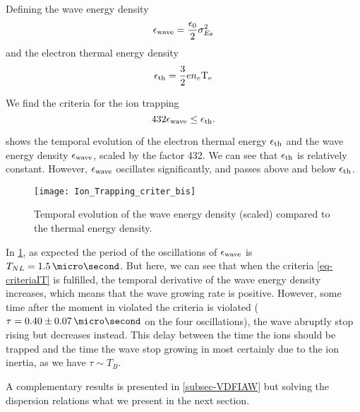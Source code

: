     Defining the wave energy  density
    \begin{equation} \label{eq-waveE}
      \epsilon_{\rm wave} = \frac{\epsilon_0}{2} \sigma_{E_{\theta}}^2
    \end{equation}
    and the electron thermal energy density
    \begin{equation} \label{eq-thE}
      \epsilon_{\rm th} = \frac{3}{2} e n_e \mathrm{T_e}
    \end{equation}
    
    We find the criteria for the ion trapping
    \begin{equation} \label{eq-criteriaIT}
      432 \epsilon_{\rm wave} \leq \epsilon_{\rm th}.
    \end{equation}
    
     shows the temporal evolution of the electron thermal energy $\epsilon_{\rm th}$ and the wave energy density $\epsilon_{\rm wave}$, scaled by the factor 432.
    We can see that $\epsilon_{\rm th}$ is relatively constant.
    However, $\epsilon_{\rm wave}$  oscillates significantly, and passes above and below $\epsilon_{\rm th}$.
    
    \begin{figure}[hbtp]
      \centering
      \texttt{[image: Ion\_Trapping\_criter\_bis]}
      \caption{Temporal evolution of the wave energy density (scaled) compared to the thermal energy density.}
      \label{fig-tempITcrit}
    \end{figure}
    
    In \cref{fig-tempITcrit}, as expected the period of the oscillations of $\epsilon_{\rm wave}$ is $T_{NL} = 1.5\,\micro\second$.
    But here, we can see that when the criteria \cref{eq-criteriaIT} is fulfilled, the temporal derivative of the wave energy density increases, which means that the wave growing rate is positive.
    However, some time after the moment in violated the criteria is violated ($\tau = 0.40 \pm 0.07 \,\micro\second$ on the four oscillations), the wave abruptly stop rising but decreases instead.
    This delay between the time the ions should be trapped and the time the wave stop growing in most certainly due to the ion inertia, as we have $\tau \sim T_B$.
    
    A complementary results is presented in \cref{subsec-VDFIAW} but solving the dispersion relations what we present in the next section.
    
      